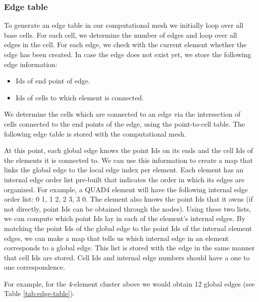 
\subsubsection{Edge table}
\label{sec:edge-computation}
To generate an edge table in our computational mesh we initially loop over all base cells. For each cell, we determine the number of edges and loop over all edges in the cell. For each edge, we check with the current element whether the edge has been created. In case the edge does not exist yet, we store the following edge information:

\begin{itemize}
\item Ids of end point of edge.
\item Ids of cells to which element is connected.
\end{itemize}

We determine the cells which are connected to an edge via the intersection of cells connected to the end points of the edge, using the point-to-cell table. The following edge table is stored with the computational mesh. 

At this point, each global edge knows the point Ids on its ends and the cell Ids of the elements it is connected to. We can use this information to create a map that links the global edge to the local edge index per element. Each element has an internal edge order list pre-built that indicates the order in which its edges are organized. For example, a QUAD4 element will have the following internal edge order list: 0 1, 1 2, 2 3, 3 0. The element also knows the point Ids that it owns (if not directly, point Ids can be obtained through the nodes). Using these two lists, we can compute which point Ids lay in each of the element's internal edges. By matching the point Ids of the global edge to the point Ids of the internal element edges, we can make a map that tells us which internal edge in an element corresponds to a global edge. This list is stored with the edge in the same manner that cell Ids are stored. Cell Ids and internal edge numbers should have a one to one correspondence.

For example, for the 4-element cluster above we would obtain 12 global edges (see Table \ref{tab:edge-table}).

